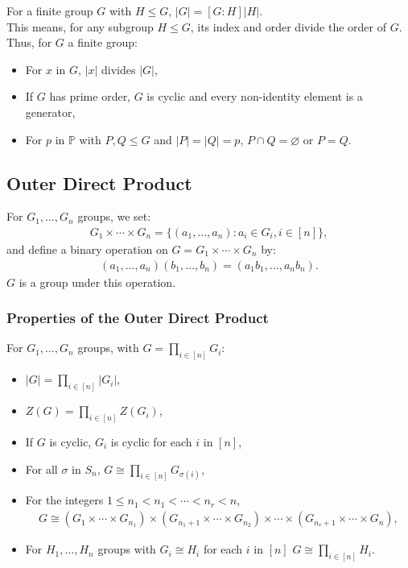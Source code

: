 For a finite group $G$ with $H \leq G$, $|G| = [G : H]|H|$.
\\[\baselineskip]
This means, for any subgroup $H \leq G$, its index and order divide the 
order of $G$. Thus, for $G$ a finite group: \begin{itemize}
    \item For $x$ in $G$, $|x|$ divides $|G|$,
    \item If $G$ has prime order, $G$ is cyclic and every
        non-identity element is a generator,
    \item For $p$ in $\mathbb{P}$ with $P, Q \leq G$ and $|P| = |Q| = p$,
        $P \cap Q = \varnothing$ or $P = Q$.
\end{itemize}

\subsection{Outer Direct Product}

For $G_1, \ldots, G_n$ groups, we set: \begin{align*}
    G_1 \times \cdots \times G_n = \{(a_1, \ldots, a_n) : a_i \in G_i, i \in [n] \},
\end{align*} and define a binary operation on 
$G = G_1 \times \cdots \times G_n$ by: \begin{align*}
    (a_1, \ldots, a_n)(b_1, \ldots, b_n) = (a_1b_1, \ldots, a_nb_n).
\end{align*} $G$ is a group under this operation.

\subsubsection{Properties of the Outer Direct Product}

For $G_1, \ldots, G_n$ groups, with $G = \prod_{i \in [n]} G_i$: \begin{itemize}
    \item $|G| = \prod_{i \in [n]}|G_i|$,
    \item $Z(G) = \prod_{i \in [n]}Z(G_i)$,
    \item If $G$ is cyclic, $G_i$ is cyclic for each $i$ in $[n]$,
    \item For all $\sigma$ in $S_n$, $G \cong \prod_{i \in [n]} G_{\sigma(i)}$,
    \item For the integers $1 \leq n_1 < n_1 < \cdots < n_r < n$, 
        \begin{gather*}
            G \cong 
            (G_1 \times \cdots \times G_{n_1}) \times 
            (G_{n_1 + 1} \times \cdots \times G_{n_2}) \times \cdots \times
            (G_{n_r + 1} \times \cdots \times G_n),
        \end{gather*}
    \item For $H_1, \ldots, H_n$ groups with $G_i \cong H_i$ for each $i$ in $[n]$
        $G \cong \prod_{i \in [n]} H_i$.
\end{itemize}
